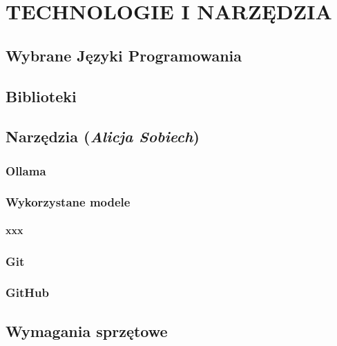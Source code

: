 \chapter{TECHNOLOGIE I NARZĘDZIA}

\section{Wybrane Języki Programowania}

\section{Biblioteki}

\section{Narzędzia (\textit{Alicja Sobiech})}
\subsection{Ollama}

\subsection{Wykorzystane modele}

\subsubsection{xxx}

\subsection{Git}

\subsection{GitHub}

\section{Wymagania sprzętowe}
